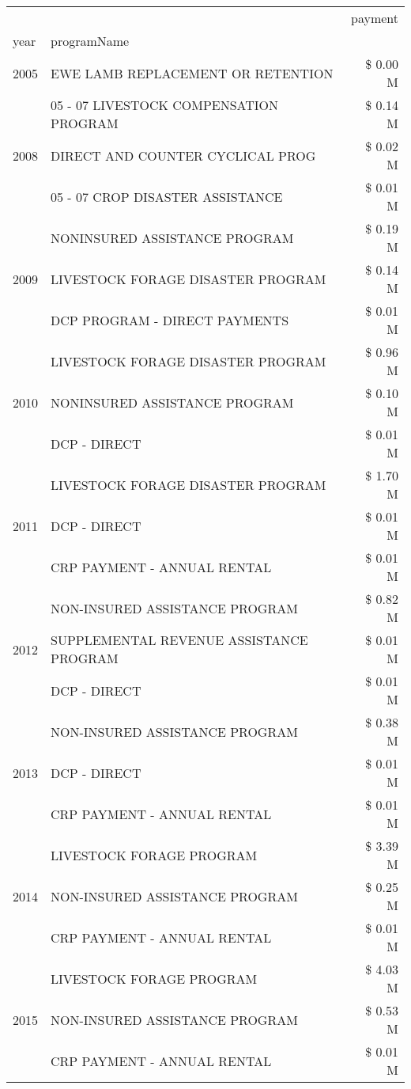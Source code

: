 \begin{tabular}{llr}
\toprule
 &  & payment \\
year & programName &  \\
\midrule
2005 & EWE LAMB REPLACEMENT OR RETENTION & \$ 0.00 M \\
\cline{1-3}
\multirow[t]{3}{*}{2008} & 05 - 07 LIVESTOCK COMPENSATION PROGRAM & \$ 0.14 M \\
 & DIRECT AND COUNTER CYCLICAL PROG & \$ 0.02 M \\
 & 05 - 07 CROP DISASTER ASSISTANCE & \$ 0.01 M \\
\cline{1-3}
\multirow[t]{3}{*}{2009} & NONINSURED ASSISTANCE PROGRAM & \$ 0.19 M \\
 & LIVESTOCK FORAGE DISASTER  PROGRAM & \$ 0.14 M \\
 & DCP PROGRAM - DIRECT PAYMENTS & \$ 0.01 M \\
\cline{1-3}
\multirow[t]{3}{*}{2010} & LIVESTOCK FORAGE DISASTER PROGRAM & \$ 0.96 M \\
 & NONINSURED ASSISTANCE PROGRAM & \$ 0.10 M \\
 & DCP - DIRECT & \$ 0.01 M \\
\cline{1-3}
\multirow[t]{3}{*}{2011} & LIVESTOCK FORAGE DISASTER PROGRAM & \$ 1.70 M \\
 & DCP - DIRECT & \$ 0.01 M \\
 & CRP PAYMENT - ANNUAL RENTAL & \$ 0.01 M \\
\cline{1-3}
\multirow[t]{3}{*}{2012} & NON-INSURED ASSISTANCE PROGRAM & \$ 0.82 M \\
 & SUPPLEMENTAL REVENUE ASSISTANCE PROGRAM & \$ 0.01 M \\
 & DCP - DIRECT & \$ 0.01 M \\
\cline{1-3}
\multirow[t]{3}{*}{2013} & NON-INSURED ASSISTANCE PROGRAM & \$ 0.38 M \\
 & DCP - DIRECT & \$ 0.01 M \\
 & CRP PAYMENT - ANNUAL RENTAL & \$ 0.01 M \\
\cline{1-3}
\multirow[t]{3}{*}{2014} & LIVESTOCK FORAGE PROGRAM & \$ 3.39 M \\
 & NON-INSURED ASSISTANCE PROGRAM & \$ 0.25 M \\
 & CRP PAYMENT - ANNUAL RENTAL & \$ 0.01 M \\
\cline{1-3}
\multirow[t]{3}{*}{2015} & LIVESTOCK FORAGE PROGRAM & \$ 4.03 M \\
 & NON-INSURED ASSISTANCE PROGRAM & \$ 0.53 M \\
 & CRP PAYMENT - ANNUAL RENTAL & \$ 0.01 M \\

\end{tabular}
